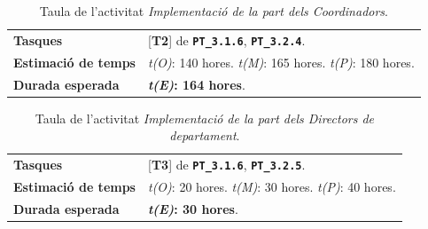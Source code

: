 \documentclass[a4paper,12pt]{ThesisStyle}
\begin{document}
\begin{table}[H]
  \begin{tabularx}{\textwidth}{l | X}
    \toprule
    \rowcolor{Blue}
    \multicolumn{2}{c}{\texttt{\textbf{A13:}} Implementació de la part dels Coordinadors}\\
    \midrule[0.9pt]
    \textbf{Tasques}                 & [\textbf{T2}] de \texttt{\textbf{PT\_3.1.6}}, \texttt{\textbf{PT\_3.2.4}}.\\
    \midrule
    \textbf{Estimació de temps}      & \textit{t(O)}: 140 hores.
    \newline \textit{t(M)}: 165 hores.
    \newline \textit{t(P)}: 180 hores.\\
    \midrule
    \textbf{Durada esperada}         & \textbf{\textit{t(E)}: 164 hores}.\\
    \bottomrule
  \end{tabularx}
  \caption{\label{taula:a13} Taula de l'activitat \emph{Implementació de la part dels Coordinadors}.}
\end{table}

\begin{table}[H]
  \begin{tabularx}{\textwidth}{l | X}
    \toprule
    \rowcolor{Blue}
    \multicolumn{2}{c}{\texttt{\textbf{A14:}} Implementació de la part dels Directors de departament}\\
    \midrule[0.9pt]
    \textbf{Tasques}                 & [\textbf{T3}] de \texttt{\textbf{PT\_3.1.6}}, \texttt{\textbf{PT\_3.2.5}}.\\
    \midrule
    \textbf{Estimació de temps}      & \textit{t(O)}: 20 hores.
    \newline \textit{t(M)}: 30 hores.
    \newline \textit{t(P)}: 40 hores.\\
    \midrule
    \textbf{Durada esperada}         & \textbf{\textit{t(E)}: 30 hores}.\\
    \bottomrule
  \end{tabularx}
  \caption{\label{taula:a14} Taula de l'activitat \emph{Implementació de la part dels Directors de departament}.}
\end{table}
\end{document}

